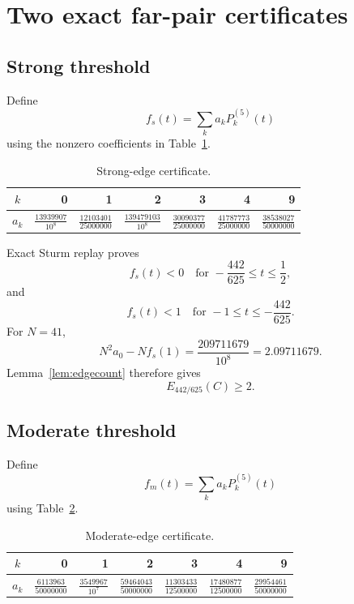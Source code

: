 \documentclass[11pt]{article}
\begin{document}
\section{Two exact far-pair certificates}

\subsection{Strong threshold}

Define
\[
f_s(t)=\sum_k a_kP_k^{(5)}(t)
\]
using the nonzero coefficients in Table~\ref{tab:strong}.

\begin{table}[ht]
\centering
\begin{tabular}{crrrrrr}
\toprule
$k$ & 0 & 1 & 2 & 3 & 4 & 9\\
\midrule
$a_k$
& $\frac{13939907}{10^8}$
& $\frac{12103401}{25000000}$
& $\frac{139479103}{10^8}$
& $\frac{30090377}{25000000}$
& $\frac{41787773}{25000000}$
& $\frac{38538027}{50000000}$\\
\bottomrule
\end{tabular}
\caption{Strong-edge certificate.}
\label{tab:strong}
\end{table}

Exact Sturm replay proves
\[
f_s(t)<0\quad\text{for }-\frac{442}{625}\le t\le\frac12,
\]
and
\[
f_s(t)<1\quad\text{for }-1\le t\le-\frac{442}{625}.
\]
For $N=41$,
\[
N^2a_0-Nf_s(1)=\frac{209711679}{10^8}=2.09711679.
\]
Lemma~\ref{lem:edgecount} therefore gives
\begin{equation}\label{eq:strong}
E_{442/625}(C)\ge2.
\end{equation}

\subsection{Moderate threshold}

Define
\[
f_m(t)=\sum_k a_kP_k^{(5)}(t)
\]
using Table~\ref{tab:moderate}.

\begin{table}[ht]
\centering
\begin{tabular}{crrrrrr}
\toprule
$k$ & 0 & 1 & 2 & 3 & 4 & 9\\
\midrule
$a_k$
& $\frac{6113963}{50000000}$
& $\frac{3549967}{10^7}$
& $\frac{59464043}{50000000}$
& $\frac{11303433}{12500000}$
& $\frac{17480877}{12500000}$
& $\frac{29954461}{50000000}$\\
\bottomrule
\end{tabular}
\caption{Moderate-edge certificate.}
\label{tab:moderate}
\end{table}
\end{document}
